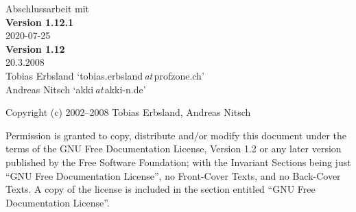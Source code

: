 %
%

\begin{titlepage}
	\vspace*{7cm}
	\begin{center}
		\Huge
		Abschlussarbeit mit \DMLLaTeX\\
		\vspace{1cm}
		\large
		\textbf{Version 1.12.1}\\
		2020-07-25\\
		\textbf{Version 1.12}\\
		20.3.2008\\
		\vspace{2cm}
		Tobias Erbsland \enquote*{tobias.erbsland\,\emph{at}\,profzone.ch}\\
		Andreas Nitsch \enquote*{akki\,\emph{at}\,akki-n.de}\\
	\end{center}
	\normalsize
	\vfill
	Copyright (c) 2002--2008 Tobias Erbsland, Andreas Nitsch

Permission is granted to copy, distribute and/or modify this document
under the terms of the GNU Free Documentation License, Version 1.2
or any later version published by the Free Software Foundation;
with the Invariant Sections being just \enquote{GNU Free Documentation License},
no Front-Cover Texts, and no Back-Cover Texts.
A copy of the license is included in the section entitled \enquote{GNU
Free Documentation License}.
	
\end{titlepage}

\tableofcontents

\listoffigures

\listoftables


%
%
